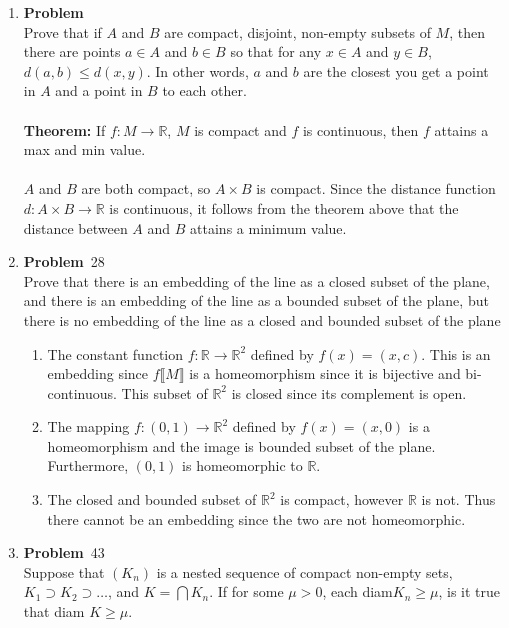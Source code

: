 \documentclass[12pt]{amsart}
\newcommand{\benu}{\begin{enumerate}}
\newcommand{\eenu}{\end{enumerate}}
\theoremstyle{definition}
\newcommand{\mbR}{\mathbb{R}}
\newcommand{\itep}{\item {\bfseries Problem}\ }
\begin{document}
\begin{enumerate}[series=p]
\newpage

\itep \\
Prove that if $A$ and $B$ are compact, disjoint, non-empty subsets of $M$, then there are points $a\in A$ and $b\in B$ so that for any $x\in A$ and $y\in B$, $d(a,b)\leq d(x,y)$. In other words, $a$ and $b$ are the closest you get a point in $A$ and a point in $B$ to each other.
\\
\\
\textbf{Theorem:}
If $f:M \to \mbR$, $M$ is compact and $f$ is continuous, then $f$ attains a max and min value.
\\\\
$A$ and $B$ are both compact, so $A \times B$ is compact.  Since the distance function $d: A \times B \to \mbR$ is continuous, it follows from the theorem above that the distance between $A$ and $B$ attains a minimum value.

\newpage

\itep 28\\
Prove that there is an embedding of the line as a closed subset of the plane, and there is an embedding of the line as a bounded subset of the plane, but there is no embedding of the line as a closed and bounded subset of the plane

	\benu
		\item The constant function $f: \mbR \to \mbR^2$ defined by $f(x) = (x, c)$.  This is an embedding since $f \llbracket M \rrbracket$ is a homeomorphism since it is bijective and bi-continuous.  This subset of $\mbR^2$ is closed since its complement is open.
		\item The mapping $f: (0,1) \to \mbR^2$ defined by $f(x) = (x, 0)$ is a homeomorphism and the image is bounded subset of the plane.  Furthermore, $(0,1)$ is homeomorphic to $\mbR$.
		\item The closed and bounded subset of $\mbR^2$ is compact, however $\mbR$ is not.  Thus there cannot be an embedding since the two are not homeomorphic.
	\eenu
\newpage

\itep 43 \\
Suppose that $(K_n)$ is a nested sequence of compact non-empty sets, $K_1 \supset K_2 \supset \dots $, and $K = \bigcap K_n$.  If for some $\mu > 0$, each diam$K_n \geq \mu$, is it true that diam $K \geq \mu$.
\newpage


\end{enumerate}
\end{document}
